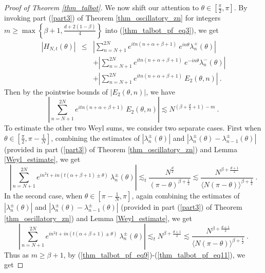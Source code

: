 \documentclass[12pt]{amsart}
\theoremstyle{definition}
\numberwithin{equation}{section}
\begin{document}
\begin{proof}[Proof of Theorem \ref{thm_talbot}]
We now shift our attention to $\theta \in \left[\frac{\pi}{2},\pi\right]$. By invoking part (\ref{part3}) of Theorem \ref{thm_oscillatory_zn} for integers $m \ge \max\left\{\beta +1,\frac{d+2(1-\beta)}{4} \right\}$ into (\ref{thm_talbot_pf_eq3}), we get
\begin{eqnarray*}
\left|H_{N,t}(\theta)\right| &\le& \left|\sum_{n=N+1}^{2N} e^{itn(n+\alpha+\beta+1)}\:e^{in\theta}\lambda^+_n(\theta)\right|\\
&&+ \left|\sum_{n=N+1}^{2N} e^{itn(n+\alpha+\beta+1)}\:e^{-in\theta}\lambda^-_n(\theta)\right|\\
&&+\left|\sum_{n=N+1}^{2N} e^{itn(n+\alpha+\beta+1)}\:E_2(\theta, n)\right|\:.
\end{eqnarray*}
Then by the pointwise bounds of $\left|E_2(\theta, n)\right|$, we have
\begin{equation} \label{thm_talbot_pf_eq9}
\left|\sum_{n=N+1}^{2N} e^{itn(n+\alpha+\beta+1)}\:E_2(\theta, n)\right| \lesssim N^{\left(\beta + \frac{d}{2}+1\right)-m}\:.
\end{equation}
To estimate the other two Weyl sums, we consider two separate cases. First when $\theta \in \left[\frac{\pi}{2},\pi -\frac{1}{N}\right]$, combining the estimates of $|\lambda^\pm_n(\theta)|$ and $|\lambda^\pm_n(\theta)-\lambda^\pm_{n-1}(\theta)|$ (provided in part (\ref{part3}) of Theorem \ref{thm_oscillatory_zn}) and Lemma \ref{Weyl_estimate}, we get
\begin{equation} \label{thm_talbot_pf_eq10}
\left|\sum_{n=N+1}^{2N} e^{in^2t+in\left(t(\alpha+\beta+1)\pm \theta\right)}\:\lambda^\pm_n(\theta)\right| \lesssim_t \frac{N^{\frac{d}{2}}}{(\pi-\theta)^{\beta+\frac{1}{2}}} \lesssim \frac{N^{\beta+\frac{d+1}{2}}}{\langle N(\pi-\theta)\rangle^{\beta+\frac{1}{2}}}\:.
\end{equation}
In the second case, when $\theta \in \left[\pi-\frac{1}{N},\pi\right]$, again combining the estimates of $|\lambda^\pm_n(\theta)|$ and $|\lambda^\pm_n(\theta)-\lambda^\pm_{n-1}(\theta)|$ (provided in part (\ref{part3}) of Theorem \ref{thm_oscillatory_zn}) and Lemma \ref{Weyl_estimate}, we get
\begin{equation} \label{thm_talbot_pf_eq11}
\left|\sum_{n=N+1}^{2N} e^{in^2t+in\left(t(\alpha+\beta+1)\pm \theta\right)}\:\lambda^\pm_n(\theta)\right| \lesssim_t N^{\beta+\frac{d+1}{2}}\lesssim \frac{N^{\beta+\frac{d+1}{2}}}{\langle N(\pi-\theta)\rangle^{\beta+\frac{1}{2}}}\:.
\end{equation}
Thus as $m \ge \beta +1$, by (\ref{thm_talbot_pf_eq9})-(\ref{thm_talbot_pf_eq11}), we get 

\end{proof}
\end{document}
